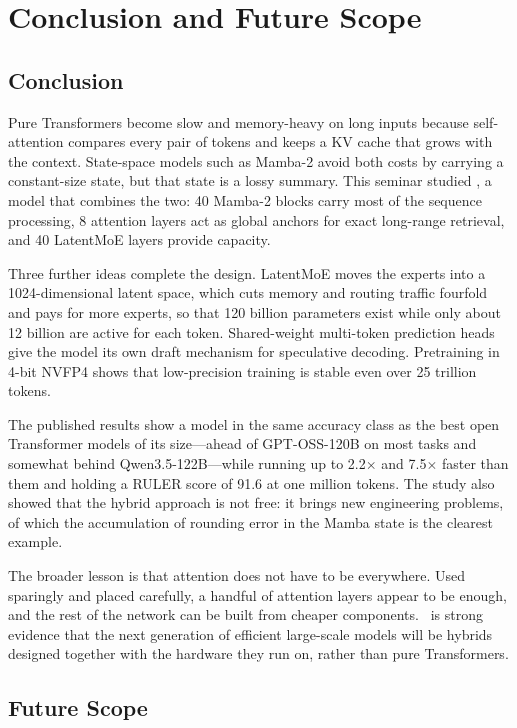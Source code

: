 \chapter{Conclusion and Future Scope}
\label{ch:conclusion}

\section{Conclusion}

Pure Transformers become slow and memory-heavy on long inputs because
self-attention compares every pair of tokens and keeps a KV cache that grows
with the context. State-space models such as Mamba-2 avoid both costs by
carrying a constant-size state, but that state is a lossy summary. This
seminar studied \NS, a model that combines the two: 40 Mamba-2 blocks carry
most of the sequence processing, 8 attention layers act as global anchors for
exact long-range retrieval, and 40 LatentMoE layers provide capacity.

Three further ideas complete the design. LatentMoE moves the experts into a
1024-dimensional latent space, which cuts memory and routing traffic fourfold
and pays for more experts, so that 120 billion parameters exist while only
about 12 billion are active for each token. Shared-weight multi-token
prediction heads give the model its own draft mechanism for speculative
decoding. Pretraining in 4-bit NVFP4 shows that low-precision training is
stable even over 25 trillion tokens.

The published results show a model in the same accuracy class as the best
open Transformer models of its size---ahead of GPT-OSS-120B on most tasks and
somewhat behind Qwen3.5-122B---while running up to 2.2$\times$ and
7.5$\times$ faster than them and holding a RULER score of 91.6 at one million
tokens. The study also showed that the hybrid approach is not free: it brings
new engineering problems, of which the accumulation of rounding error in the
Mamba state is the clearest example.

The broader lesson is that attention does not have to be everywhere. Used
sparingly and placed carefully, a handful of attention layers appear to be
enough, and the rest of the network can be built from cheaper components.
\NS\ is strong evidence that the next generation of efficient large-scale
models will be hybrids designed together with the hardware they run on, rather
than pure Transformers.

\section{Future Scope}


